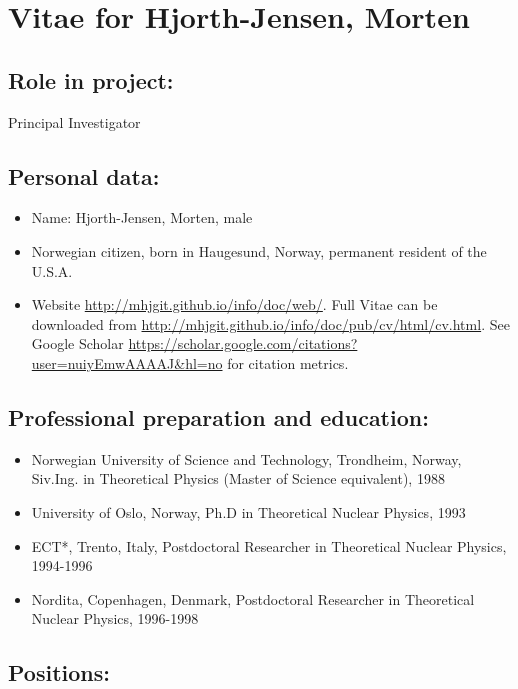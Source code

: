 \documentclass[11pt]{revtex4-1}
\begin{document}
\section*{Vitae for Hjorth-Jensen, Morten}

\subsection*{Role in project:}
Principal Investigator

\subsection*{Personal data:}
\begin{itemize}
\item Name: Hjorth-Jensen, Morten, male
\item Norwegian citizen, born in Haugesund, Norway, permanent resident of the U.S.A.
\item Website \url{http://mhjgit.github.io/info/doc/web/}. Full Vitae can be downloaded from \url{http://mhjgit.github.io/info/doc/pub/cv/html/cv.html}. See Google Scholar \url{https://scholar.google.com/citations?user=nuiyEmwAAAAJ&hl=no} for citation metrics.

\end{itemize}

\subsection*{Professional preparation and education:}
\begin{itemize}
\item Norwegian University of Science and Technology, Trondheim, Norway,  Siv.Ing. in Theoretical Physics (Master of Science equivalent),  1988 

\item University of Oslo, Norway,  Ph.D in Theoretical Nuclear Physics, 1993

\item ECT*, Trento, Italy,  Postdoctoral Researcher in Theoretical Nuclear Physics,  1994-1996

\item Nordita, Copenhagen, Denmark, Postdoctoral Researcher in Theoretical Nuclear Physics, 1996-1998
\end{itemize}

\subsection*{Positions:}
\end{document}
